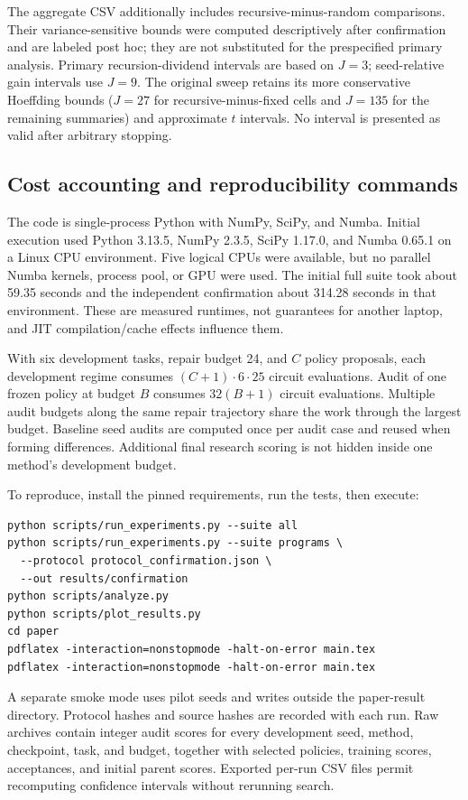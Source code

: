 The aggregate CSV additionally includes recursive-minus-random comparisons. Their variance-sensitive bounds were computed descriptively after confirmation and are labeled post hoc; they are not substituted for the prespecified primary analysis. Primary recursion-dividend intervals are based on $J=3$; seed-relative gain intervals use $J=9$. The original sweep retains its more conservative Hoeffding bounds ($J=27$ for recursive-minus-fixed cells and $J=135$ for the remaining summaries) and approximate $t$ intervals. No interval is presented as valid after arbitrary stopping.

\subsection{Cost accounting and reproducibility commands}
The code is single-process Python with NumPy, SciPy, and Numba. Initial execution used Python 3.13.5, NumPy 2.3.5, SciPy 1.17.0, and Numba 0.65.1 on a Linux CPU environment. Five logical CPUs were available, but no parallel Numba kernels, process pool, or GPU were used. The initial full suite took about 59.35 seconds and the independent confirmation about 314.28 seconds in that environment. These are measured runtimes, not guarantees for another laptop, and JIT compilation/cache effects influence them.

With six development tasks, repair budget 24, and $C$ policy proposals, each development regime consumes $(C+1)\cdot6\cdot25$ circuit evaluations. Audit of one frozen policy at budget $B$ consumes $32(B+1)$ circuit evaluations. Multiple audit budgets along the same repair trajectory share the work through the largest budget. Baseline seed audits are computed once per audit case and reused when forming differences. Additional final research scoring is not hidden inside one method's development budget.

To reproduce, install the pinned requirements, run the tests, then execute:
\begin{verbatim}
python scripts/run_experiments.py --suite all
python scripts/run_experiments.py --suite programs \
  --protocol protocol_confirmation.json \
  --out results/confirmation
python scripts/analyze.py
python scripts/plot_results.py
cd paper
pdflatex -interaction=nonstopmode -halt-on-error main.tex
pdflatex -interaction=nonstopmode -halt-on-error main.tex
\end{verbatim}
A separate smoke mode uses pilot seeds and writes outside the paper-result directory. Protocol hashes and source hashes are recorded with each run. Raw archives contain integer audit scores for every development seed, method, checkpoint, task, and budget, together with selected policies, training scores, acceptances, and initial parent scores. Exported per-run CSV files permit recomputing confidence intervals without rerunning search.

